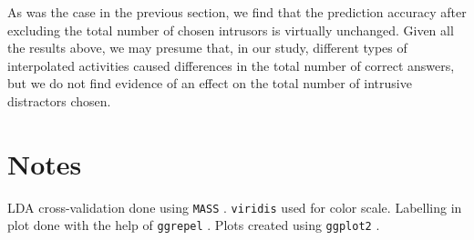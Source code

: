 \documentclass[11pt,]{article}
\begin{document}
As was the case in the previous section, we find that the prediction
accuracy after excluding the total number of chosen intrusors is
virtually unchanged. Given all the results above, we may presume that,
in our study, different types of interpolated activities caused
differences in the total number of correct answers, but we do not find
evidence of an effect on the total number of intrusive distractors
chosen.

\hypertarget{notes}{%
\section{Notes}\label{notes}}

LDA cross-validation done using \texttt{MASS}
\citep{venablesModernAppliedStatistics2002}. \texttt{viridis}
\citep{garnierViridisDefaultColor2018} used for color scale. Labelling
in plot done with the help of \texttt{ggrepel}
\citep{slowikowskiGgrepelAutomaticallyPosition2018}. Plots created using
\texttt{ggplot2} \citep{wickhamGgplot2ElegantGraphics2016}.



\end{document}
